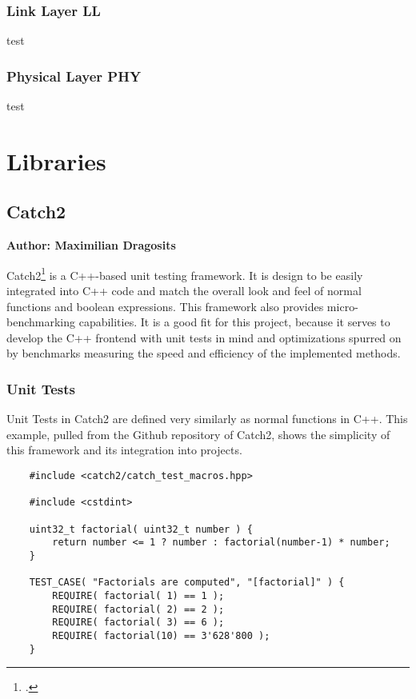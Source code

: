 \subsubsection{Link Layer LL}
test
\subsubsection{Physical Layer PHY}
test

\section{Libraries}

\subsection{Catch2}
\textbf{Author: Maximilian Dragosits}

Catch2\footcite{catch2_main_site} is a C++-based unit testing framework. It is design to be easily integrated into C++ code and match the overall look and feel
of normal functions and boolean expressions. This framework also provides micro-benchmarking capabilities. It is a good fit for this project, because it serves
to develop the C++ frontend with unit tests in mind and optimizations spurred on by benchmarks measuring the speed and efficiency of the implemented methods.

\subsubsection{Unit Tests}

Unit Tests in Catch2 are defined very similarly as normal functions in C++. This example, pulled from the Github repository of Catch2, shows the simplicity of
this framework and its integration into projects.

\begin{verbatim}
    #include <catch2/catch_test_macros.hpp>

    #include <cstdint>
    
    uint32_t factorial( uint32_t number ) {
        return number <= 1 ? number : factorial(number-1) * number;
    }
    
    TEST_CASE( "Factorials are computed", "[factorial]" ) {
        REQUIRE( factorial( 1) == 1 );
        REQUIRE( factorial( 2) == 2 );
        REQUIRE( factorial( 3) == 6 );
        REQUIRE( factorial(10) == 3'628'800 );
    }
\end{verbatim}

